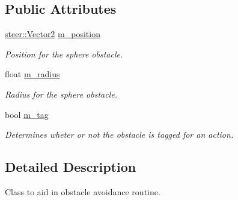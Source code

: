 \subsection*{Public Attributes}
\begin{DoxyCompactItemize}
\item 
\hypertarget{classsteer_1_1_sphere_obstacle_a39558a92cf0af777f99e36030dcc7ab3}{\hyperlink{structsteer_1_1_vector2}{steer\-::\-Vector2} \hyperlink{classsteer_1_1_sphere_obstacle_a39558a92cf0af777f99e36030dcc7ab3}{m\-\_\-position}}\label{classsteer_1_1_sphere_obstacle_a39558a92cf0af777f99e36030dcc7ab3}

\begin{DoxyCompactList}\small\item\em Position for the sphere obstacle. \end{DoxyCompactList}\item 
\hypertarget{classsteer_1_1_sphere_obstacle_a05d8ec92a5bcb1076c86fcf70acf1d9c}{float \hyperlink{classsteer_1_1_sphere_obstacle_a05d8ec92a5bcb1076c86fcf70acf1d9c}{m\-\_\-radius}}\label{classsteer_1_1_sphere_obstacle_a05d8ec92a5bcb1076c86fcf70acf1d9c}

\begin{DoxyCompactList}\small\item\em Radius for the sphere obstacle. \end{DoxyCompactList}\item 
\hypertarget{classsteer_1_1_sphere_obstacle_a766848b9bb8832880ae6fd27a10b5790}{bool \hyperlink{classsteer_1_1_sphere_obstacle_a766848b9bb8832880ae6fd27a10b5790}{m\-\_\-tag}}\label{classsteer_1_1_sphere_obstacle_a766848b9bb8832880ae6fd27a10b5790}

\begin{DoxyCompactList}\small\item\em Determines wheter or not the obstacle is tagged for an action. \end{DoxyCompactList}\end{DoxyCompactItemize}


\subsection{Detailed Description}
Class to aid in obstacle avoidance routine. 

